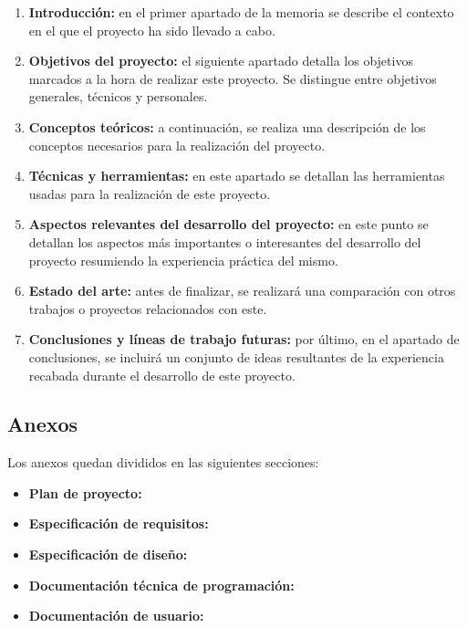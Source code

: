 \begin{enumerate}
	\item \textbf{Introducción:} en el primer apartado de la memoria se describe el contexto en el que el proyecto ha sido llevado a cabo.
	\item \textbf{Objetivos del proyecto:} el siguiente apartado detalla los objetivos marcados a la hora de realizar este proyecto. Se distingue entre objetivos generales, técnicos y personales.
	\item \textbf{Conceptos teóricos:} a continuación, se realiza una descripción de los conceptos necesarios para la realización del proyecto.
	\item \textbf{Técnicas y herramientas:} en este apartado se detallan las herramientas usadas para la
realización de este proyecto.
	\item \textbf{Aspectos relevantes del desarrollo del proyecto:} en este punto se detallan los aspectos más importantes o interesantes del desarrollo del proyecto resumiendo la experiencia práctica del mismo.
	\item \textbf{Estado del arte:} antes de finalizar, se realizará una comparación con otros trabajos o proyectos relacionados con este.
	\item \textbf{Conclusiones y líneas de trabajo futuras:} por último, en el apartado de conclusiones, se incluirá un conjunto de ideas resultantes de la experiencia recabada durante el desarrollo de este proyecto.
\end{enumerate}


\subsection{Anexos}
Los anexos quedan divididos en las siguientes secciones:

\begin{itemize}
	\item \textbf{Plan de proyecto:}
	\item \textbf{Especificación de requisitos:}
	\item \textbf{Especificación de diseño:}
	\item \textbf{Documentación técnica de programación:}
	\item \textbf{Documentación de usuario:}
\end{itemize}